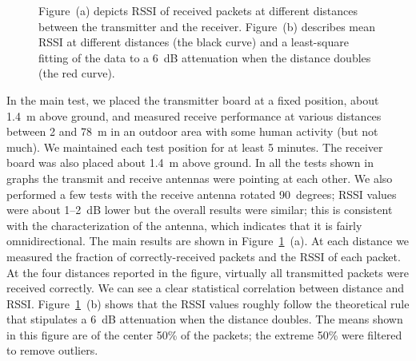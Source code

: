 \begin{figure}[h]
    \centering
    \hspace{0.01in}
    \caption{Figure~(a) depicts RSSI of received packets at different distances between 
    the transmitter and the receiver. Figure~(b) describes mean RSSI at 
    different distances (the black curve) and a least-square
    fitting of the data to a 6~dB attenuation when the distance doubles
(the red curve).}
    \label{fig:rssi}
\end{figure}

In the main test, we placed the transmitter board at a fixed position, about 1.4~m above ground, and measured receive
performance at various distances between 2 and 78~m in an outdoor area with some human activity (but not much). We 
maintained each test position for at least 5 minutes.
The receiver board was also placed about 1.4~m above ground. In all the tests shown in graphs the transmit
and receive antennas were pointing at each other. We also performed a few tests with the receive antenna rotated 90~degrees;
RSSI values were about 1--2~dB lower but the overall results were similar; this is consistent with the characterization
of the antenna, which indicates that it is fairly omnidirectional.
The main results are shown in Figure~\ref{fig:rssi}~(a).
At each distance we measured the fraction of correctly-received packets and the RSSI of each packet. At the four
distances reported in the figure, virtually all transmitted packets were received correctly. We can see a clear
statistical correlation between distance and RSSI. Figure~\ref{fig:rssi}~(b) shows that the RSSI values
roughly follow the theoretical rule that stipulates a 6~dB attenuation when the distance doubles. The means
shown in this figure are of the center 50\% of the packets; the extreme 50\% were filtered to remove outliers.

